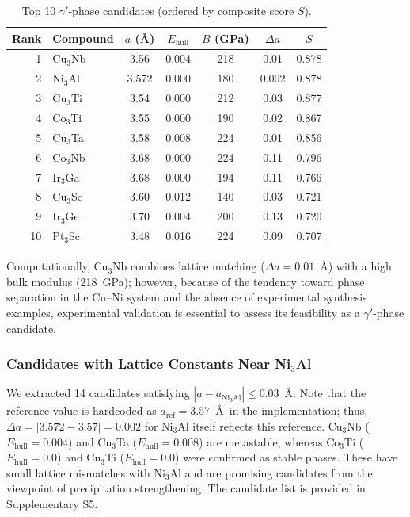 \documentclass[5p,twocolumn]{elsarticle}
\begin{document}
\begin{table}[htbp]
  \centering
  \caption{Top 10 $\gamma'$-phase candidates (ordered by composite score $S$).}
  \label{tab:gamma_prime}
  \small
  \begin{tabular}{rlccccc}
    \toprule
    Rank & Compound & $a$ (\AA) & $E_\text{hull}$ & $B$ (GPa) & $\Delta a$ & $S$ \\
    \midrule
    1 & Cu$_3$Nb & 3.56 & 0.004 & 218 & 0.01 & 0.878 \\
    2 & Ni$_3$Al & 3.572 & 0.000 & 180 & 0.002 & 0.878 \\
    3 & Cu$_3$Ti & 3.54 & 0.000 & 212 & 0.03 & 0.877 \\
    4 & Co$_3$Ti & 3.55 & 0.000 & 190 & 0.02 & 0.867 \\
    5 & Cu$_3$Ta & 3.58 & 0.008 & 224 & 0.01 & 0.856 \\
    6 & Co$_3$Nb & 3.68 & 0.000 & 224 & 0.11 & 0.796 \\
    7 & Ir$_3$Ga & 3.68 & 0.000 & 194 & 0.11 & 0.766 \\
    8 & Cu$_3$Sc & 3.60 & 0.012 & 140 & 0.03 & 0.721 \\
    9 & Ir$_3$Ge & 3.70 & 0.004 & 200 & 0.13 & 0.720 \\
    10 & Pt$_3$Sc & 3.48 & 0.016 & 224 & 0.09 & 0.707 \\
    \bottomrule
  \end{tabular}
\end{table}

Computationally, Cu$_3$Nb combines lattice matching ($\Delta a = 0.01$~\AA) with a high bulk modulus
(218~GPa); however, because of the tendency toward phase separation in the Cu--Ni system and the absence of experimental synthesis examples,
experimental validation is essential to assess its feasibility as a $\gamma'$-phase candidate.

\subsubsection{Candidates with Lattice Constants Near Ni$_3$Al}

We extracted 14 candidates satisfying $|a - a_{\text{Ni}_3\text{Al}}| \leq 0.03$~\AA.
Note that the reference value is hardcoded as $a_{\text{ref}} = 3.57$~\AA\ in the implementation;
thus, $\Delta a = |3.572 - 3.57| = 0.002$ for Ni$_3$Al itself reflects this reference.
Cu$_3$Nb ($E_\text{hull} = 0.004$) and Cu$_3$Ta ($E_\text{hull} = 0.008$) are
metastable, whereas Co$_3$Ti ($E_\text{hull} = 0.0$) and Cu$_3$Ti ($E_\text{hull} = 0.0$) were
confirmed as stable phases.
These have small lattice mismatches with Ni$_3$Al
and are promising candidates from the viewpoint of precipitation strengthening.
The candidate list is provided in Supplementary S5.
\end{document}
